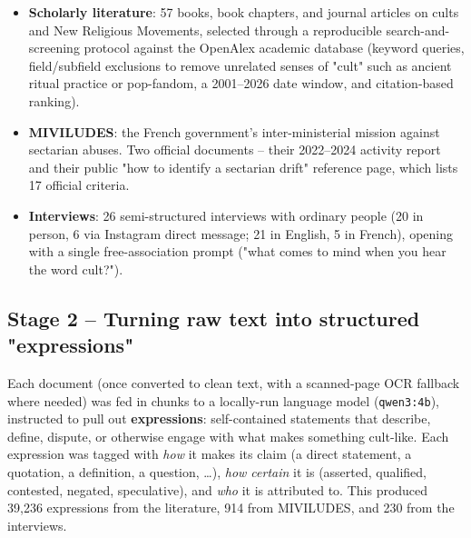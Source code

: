\documentclass[11pt,a4paper]{article}
\newcommand{\jargon}[1]{\textbf{#1}}
\begin{document}
\begin{itemize}[leftmargin=1.4em]
  \item \textbf{Scholarly literature}: 57 books, book chapters, and
  journal articles on cults and New Religious Movements, selected
  through a reproducible search-and-screening protocol against the
  OpenAlex academic database (keyword queries, field/subfield
  exclusions to remove unrelated senses of "cult" such as ancient ritual
  practice or pop-fandom, a 2001--2026 date window, and citation-based
  ranking).
  \item \textbf{MIVILUDES}: the French government's inter-ministerial
  mission against sectarian abuses. Two official documents -- their
  2022--2024 activity report and their public "how to identify a
  sectarian drift" reference page, which lists 17 official criteria.
  \item \textbf{Interviews}: 26 semi-structured interviews with ordinary
  people (20 in person, 6 via Instagram direct message; 21 in English,
  5 in French), opening with a single free-association prompt ("what
  comes to mind when you hear the word cult?").
\end{itemize}

\subsection{Stage 2 -- Turning raw text into structured "expressions"}
Each document (once converted to clean text, with a scanned-page OCR
fallback where needed) was fed in chunks to a locally-run language model
(\texttt{qwen3:4b}), instructed to pull out \jargon{expressions}:
self-contained statements that describe, define, dispute, or otherwise
engage with what makes something cult-like. Each expression was tagged
with \emph{how} it makes its claim (a direct statement, a quotation, a
definition, a question, \ldots), \emph{how certain} it is (asserted,
qualified, contested, negated, speculative), and \emph{who} it is
attributed to. This produced 39,236 expressions from the literature, 914
from MIVILUDES, and 230 from the interviews.
\end{document}
